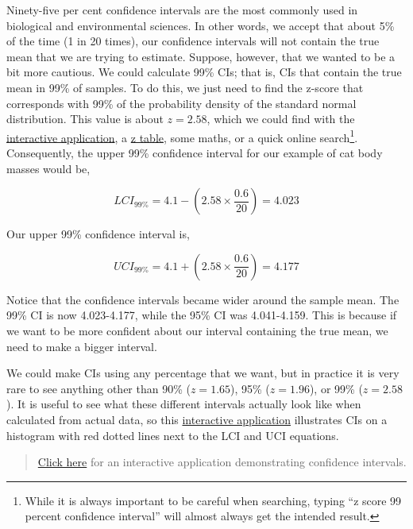 \documentclass[
]{scrbook}
\begin{document}
Ninety-five per cent confidence intervals are the most commonly used in biological and environmental sciences.
In other words, we accept that about 5\% of the time (1 in 20 times), our confidence intervals will not contain the true mean that we are trying to estimate.
Suppose, however, that we wanted to be a bit more cautious.
We could calculate 99\% CIs; that is, CIs that contain the true mean in 99\% of samples.
To do this, we just need to find the z-score that corresponds with 99\% of the probability density of the standard normal distribution.
This value is about \(z = 2.58\), which we could find with the \href{https://bradduthie.shinyapps.io/zandp/}{interactive application}, a \href{https://www.z-table.com/}{z table}, some maths, or a quick online search\footnote{While it is always important to be careful when searching, typing ``z score 99 percent confidence interval'' will almost always get the intended result.}.
Consequently, the upper 99\% confidence interval for our example of cat body masses would be,

\[LCI_{99\%} = 4.1 - \left(2.58 \times \frac{0.6}{20}\right) = 4.023\]

Our upper 99\% confidence interval is,

\[UCI_{99\%} = 4.1 + \left(2.58 \times \frac{0.6}{20}\right) = 4.177\]

Notice that the confidence intervals became wider around the sample mean.
The 99\% CI is now 4.023-4.177, while the 95\% CI was 4.041-4.159.
This is because if we want to be more confident about our interval containing the true mean, we need to make a bigger interval.

We could make CIs using any percentage that we want, but in practice it is very rare to see anything other than 90\% (\(z = 1.65\)), 95\% (\(z = 1.96\)), or 99\% (\(z = 2.58\)).
It is useful to see what these different intervals actually look like when calculated from actual data, so this \href{https://bradduthie.shinyapps.io/CI_hist_app/}{interactive application} illustrates CIs on a histogram with red dotted lines next to the LCI and UCI equations.

\begin{quote}
\href{https://bradduthie.shinyapps.io/CI_hist_app/}{Click here} for an interactive application demonstrating confidence intervals.
\end{quote}
\end{document}

